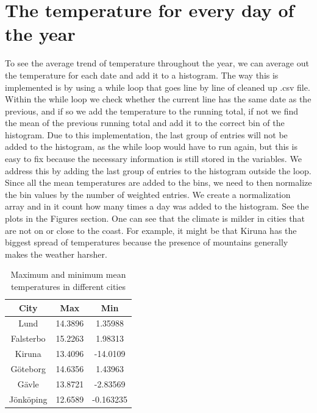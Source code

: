\section{The temperature for every day of the year}


To see the average trend of temperature throughout the year, we can average out the temperature for each date and add it to a histogram. The way this is implemented is by using a while loop that goes line by line of cleaned up .csv file. Within the while loop we check whether the current line has the same date as the previous, and if so we add the temperature to the running total, if not we find the mean of the previous running total and add it to the correct bin of the histogram. Due to this implementation, the last group of entries will not be added to the histogram, as the while loop would have to run again, but this is easy to fix because the necessary information is still stored in the variables. We address this by adding the last group of entries to the histogram outside the loop. Since all the mean temperatures are added to the bins, we need to then normalize the bin values by the number of weighted entries. We create a normalization array and in it count how many times a day was added to the histogram. See the plots in the Figures section. One can see that the climate is milder in cities that are not on or close to the coast. For example, it might be that Kiruna has the biggest spread of temperatures because the presence of mountains generally makes the weather harsher. 

\begin{table}[h]
    \centering
    \begin{tabular}{|c|c|c|} \hline
        City  & Max & Min \\ \hline
        Lund & 14.3896 & 1.35988 \\
        Falsterbo & 15.2263 & 1.98313 \\
        Kiruna & 13.4096 & -14.0109 \\
        Göteborg & 14.6356 & 1.43963 \\
        Gävle & 13.8721 & -2.83569 \\
        Jönköping & 12.6589 & -0.163235 \\
        \hline
        
    \end{tabular}
    \caption{Maximum and minimum mean temperatures in different cities}
    \label{tab:my_label}
\end{table}


